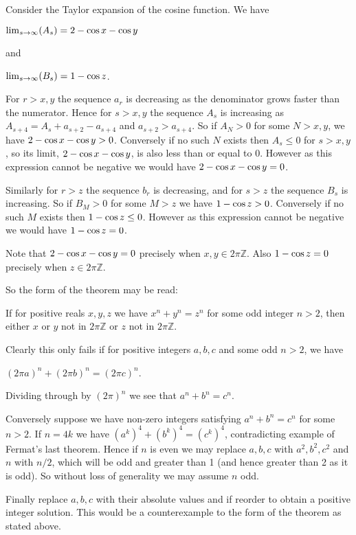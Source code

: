 \documentclass[12pt]{article}
\begin{document}
Consider the Taylor expansion of the cosine function.  We have 

${\rm lim}_{s \to \infty} (A_s)=2-{\rm cos}\, x - {\rm cos}\, y$

and

${\rm lim}_{s \to \infty} (B_s)=1- {\rm cos}\, z$.

For $r>x,y$ the sequence $a_r$ is decreasing as the denominator grows faster than the numerator. 
Hence for $s>x,y$ the sequence $A_s$ is increasing as $A_{s+4}=A_s+a_{s+2}-a_{s+4}$ and
$a_{s+2}>a_{s+4}$.   So if $A_N>0$ for some $N>x,y$, we have $2-{\rm cos}\, x - {\rm cos}\, y>0$. 
Conversely if no such $N$ exists then $A_s \leq 0$ for $s>x,y$, so its limit, $2-{\rm cos}\, x - {\rm cos}\, y$, is also  less than or equal to $0$.  However as this
expression cannot be negative we would have $2-{\rm cos}\, x - {\rm cos}\, y =0$.


Similarly for $r>z$ the sequence $b_r$ is decreasing, and for $s>z$ the sequence $B_s$ is
increasing.  So if $B_M>0$ for some $M>z$ we have $1- {\rm cos}\, z>0$. 
Conversely if no such $M$ exists then $1- {\rm cos}\, z \leq 0$.  However as this
expression cannot be negative we would have $1- {\rm cos}\, z = 0$.

Note that $2-{\rm cos}\, x - {\rm cos}\, y =0$ precisely when $x,y \in 2\pi \mathbb{Z}$.  Also 
$1- {\rm cos}\, z = 0$ precisely when $z \in 2\pi \mathbb{Z}$.

So the  form of the theorem may be read:

If for positive reals $x,y,z$ we have $x^n+y^n=z^n$ for some odd integer $n>2$, then either $x$ or
$y$ not in $2\pi \mathbb{Z}$ or $z$ not in $2\pi \mathbb{Z}$.

Clearly this only fails if for positive integers $a,b,c$ and some odd $n>2$, we have 

$(2\pi a)^n+(2\pi b)^n = (2\pi c)^n$.

Dividing through by $(2\pi)^n$ we see that $a^n + b^n =c^n$.

Conversely suppose we have non-zero integers satisfying $a^n + b^n =c^n$ for some $n>2$.  If 
$n=4k$ we have $(a^k)^4+(b^k)^4=(c^k)^4$, contradicting 
example of Fermat's last theorem.  Hence if $n$ is even we may replace $a,b,c$ with
$a^2,b^2,c^2$ and $n$ with $n/2$, which will be odd and greater than 1 (and hence greater than 2 as it is odd).  So without loss of generality we may 
assume $n$ odd. 

Finally replace $a,b,c$ with their absolute values and if 
 reorder to obtain a positive 
integer solution.  This would be a counterexample to the 
 form of the theorem as stated above.



\end{document}

